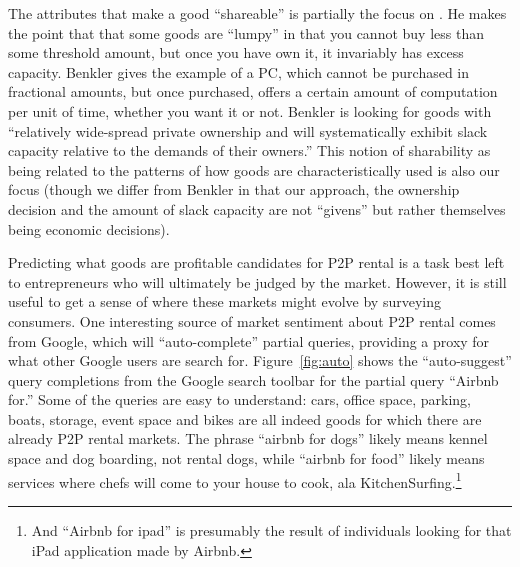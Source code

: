 \documentclass[11pt]{article}
\begin{document}
The attributes that make a good ``shareable'' is partially the focus on \cite{benkler2004sharing}.
He makes the point that that some goods are ``lumpy'' in that you cannot buy less than some threshold amount, but once you have own it, it invariably has excess capacity. 
Benkler gives the example of a PC, which cannot be purchased in fractional amounts, but once purchased, offers a certain amount of computation per unit of time, whether you want it or not. 
Benkler is looking for goods with ``relatively wide-spread private ownership and will systematically exhibit slack capacity relative to the demands of their owners.''
This notion of sharability as being related to the patterns of how goods are characteristically used is also our focus (though we differ from Benkler in that our approach, the ownership decision and the amount of slack capacity are not ``givens'' but rather themselves being economic decisions). 

Predicting what goods are profitable candidates for P2P rental is a task best left to entrepreneurs who will ultimately be judged by the market. 
However, it is still useful to get a sense of where these markets might evolve by surveying consumers. 
One interesting source of market sentiment about P2P rental comes from Google, which will ``auto-complete'' partial queries, providing a proxy for what other Google users are search for. 
Figure~\ref{fig:auto} shows the ``auto-suggest'' query completions from the Google search toolbar for the partial query ``Airbnb for.''
Some of the queries are easy to understand: 
cars, office space, parking, boats, storage, event space and bikes are all indeed goods for which there are already P2P rental markets. 
The phrase ``airbnb for dogs'' likely means kennel space and dog boarding, not rental dogs, while ``airbnb for food'' likely means services where chefs will come to your house to cook, ala KitchenSurfing.\footnote{
  And ``Airbnb for ipad'' is presumably the result of individuals looking for that iPad application made by Airbnb.
}
\end{document}
